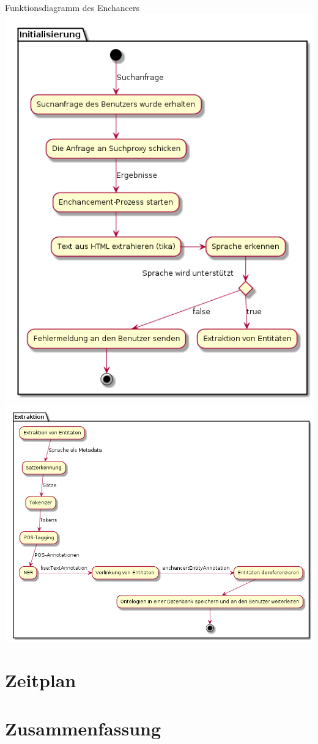 \documentclass{beamer}
\begin{document}
  \begin{frame}[c]{Funktionsdiagramm des Enchancers}
  \includegraphics[width=0.4\linewidth]{diagramms/funktionsweise.png}
  \includegraphics[width=0.5\linewidth]{diagramms/funktionsweise-extraktion.png}
  \end{frame}
  \section{Zeitplan}
  \section{Zusammenfassung}
\end{document}
